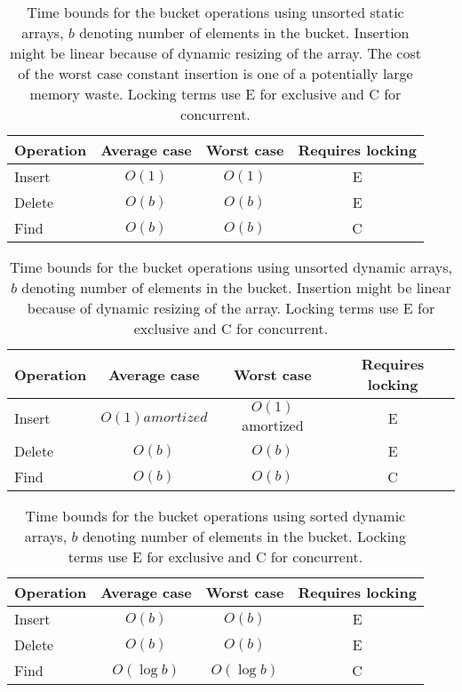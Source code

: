 \begin{table}[h!]
    \centering
    \begin{tabular}[here]{ l || c | c | c}
        Operation & Average case & Worst case & Requires locking  \\ \hline
        Insert    & $O(1)$ & $O(1)$ & E \\ \hline
        Delete    & $O(b)$ & $O(b)$ & E \\ \hline
        Find      & $O(b)$ & $O(b)$ & C  \\ \hline
    \end{tabular}
    \caption{Time bounds for the bucket operations using unsorted static
    arrays, $b$ denoting number of elements in the bucket. Insertion might be
    linear because of dynamic resizing of the array. The cost of the worst case
    constant insertion is one of a potentially large memory waste. Locking
    terms use E for exclusive and C for concurrent.}
    \label{tab:bounds:unsortedarray}
\end{table}
\begin{table}[h!]
    \centering
    \begin{tabular}[here]{ l || c | c | c}
        Operation & Average case & Worst case & Requires locking  \\ \hline
        Insert    & $O(1) amortized$ & $O(1)$ amortized & E \\ \hline
        Delete    & $O(b)$ & $O(b)$ & E \\ \hline
        Find      & $O(b)$ & $O(b)$ & C  \\ \hline
    \end{tabular}
    \caption{Time bounds for the bucket operations using unsorted dynamic
    arrays, $b$ denoting number of elements in the bucket. Insertion might be
    linear because of dynamic resizing of the array. Locking terms use E for
        exclusive and C for concurrent.}
    \label{tab:bounds:unsorteddynarray}
\end{table}
\begin{table}[h!]
    \centering
    \begin{tabular}[here]{ l || c | c | c}
        Operation & Average case & Worst case & Requires locking  \\ \hline
        Insert    & $O(b)$  & $O(b)$           & E \\ \hline
        Delete    & $O(b)$  & $O(b)$           & E \\ \hline
        Find      & $O(\log b)$ & $O(\log b)$ & C  \\ \hline
    \end{tabular}
    \caption{Time bounds for the bucket operations using sorted dynamic arrays,
    $b$ denoting number of elements in the bucket. Locking terms use E for
        exclusive and C for concurrent.}
    \label{tab:bounds:sortedarray}
\end{table}

